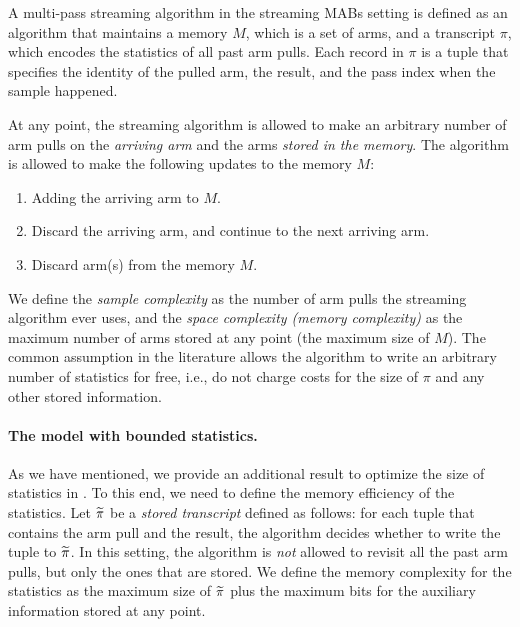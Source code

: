 A multi-pass streaming algorithm in the streaming MABs setting is defined as an algorithm that maintains a memory $M$, which is a set of arms, and a transcript $\pi$, which encodes the statistics of all past arm pulls. Each record in $\pi$ is a tuple that specifies the identity of the pulled arm, the result, and the pass index when the sample happened.

At any point, the streaming algorithm is allowed to make an arbitrary number of arm pulls on the \emph{arriving arm} and the arms \emph{stored in the memory}. The algorithm is allowed to make the following updates to the memory $M$:
\begin{enumerate}
	\item Adding the arriving arm to $M$.
	\item Discard the arriving arm, and continue to the next arriving arm.
	\item Discard arm(s) from the memory $M$.
\end{enumerate}
We define the \emph{sample complexity} as the number of arm pulls the streaming algorithm ever uses, and the \emph{space complexity (memory complexity)} as the maximum number of arms stored at any point (the maximum size of $M$). %
The common assumption in the literature \cite{AssadiW20,MaitiPK21,JinH0X21,AgarwalKP22,AWneurips22} allows the algorithm to write an arbitrary number of statistics for free, i.e., do not charge costs for the size of $\pi$ and any other stored information. 

\paragraph{The model with bounded statistics.} As we have mentioned, we provide an additional result to optimize the size of statistics in . To this end, we need to define the memory efficiency of the statistics. Let $\widetilde{\pi}$ be a \emph{stored transcript} defined as follows: for each tuple that contains the arm pull and the result, the algorithm decides whether to write the tuple to $\widetilde{\pi}$. In this setting, the algorithm is \emph{not} allowed to revisit all the past arm pulls, but only the ones that are stored. We define the memory complexity for the statistics as the maximum size of $\widetilde{\pi}$ plus the maximum bits for the auxiliary information stored at any point.


